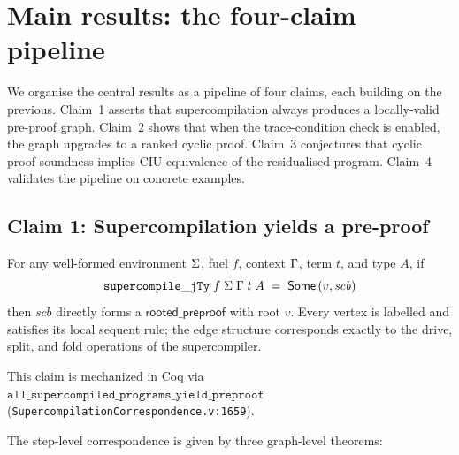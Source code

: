 \section{Main results: the four-claim pipeline}
\label{sec:equiv}

We organise the central results as a pipeline of four claims, each building on the previous.
Claim~1 asserts that supercompilation always produces a locally-valid pre-proof graph.
Claim~2 shows that when the trace-condition check is enabled, the graph upgrades to a ranked cyclic proof.
Claim~3 conjectures that cyclic proof soundness implies CIU equivalence of the residualised program.
Claim~4 validates the pipeline on concrete examples.

\subsection{Claim 1: Supercompilation yields a pre-proof}

\begin{theorem}
\label{thm:pre-proof}
For any well-formed environment $\Sigma$, fuel $f$, context $\Gamma$, term $t$, and type $A$, if
\[
\mathtt{supercompile\_jTy}\;f\;\Sigma\;\Gamma\;t\;A \;=\; \mathsf{Some}\,(v, \mathit{scb})
\]
then $\mathit{scb}$ directly forms a $\mathsf{rooted\_preproof}$ with root $v$.
Every vertex is labelled and satisfies its local sequent rule; the edge structure corresponds exactly to the drive, split, and fold operations of the supercompiler.
\end{theorem}

This claim is mechanized in Coq via $\texttt{all\_supercompiled\_programs\_yield\_preproof}$ (\texttt{SupercompilationCorrespondence.v:1659}).

The step-level correspondence is given by three graph-level theorems:

